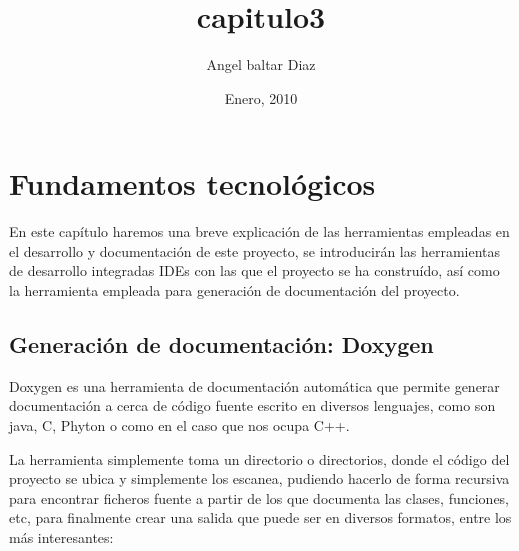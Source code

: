 


\title{capitulo3} 
\author{Angel baltar Diaz}
\date{\Large Enero, 2010} 

\chapter {Fundamentos tecnológicos}
\label{capitulo4}

En este capítulo haremos una breve explicación de las herramientas empleadas en el desarrollo y documentación de este proyecto, se introducirán las herramientas de desarrollo integradas IDEs con las que el proyecto se ha construído, así como la herramienta empleada para generación de documentación del proyecto.


\section{Generación de documentación: Doxygen}

Doxygen es una herramienta de documentación automática que permite generar documentación a cerca de código fuente escrito en diversos lenguajes, como son java, C, Phyton o como en el caso que nos ocupa C++.

La herramienta simplemente toma un directorio o directorios, donde el código del proyecto se ubica y simplemente los escanea, pudiendo hacerlo de forma recursiva para encontrar ficheros fuente a partir de los que documenta las clases, funciones, etc, para finalmente crear una salida que puede ser en diversos formatos, entre los más interesantes:

